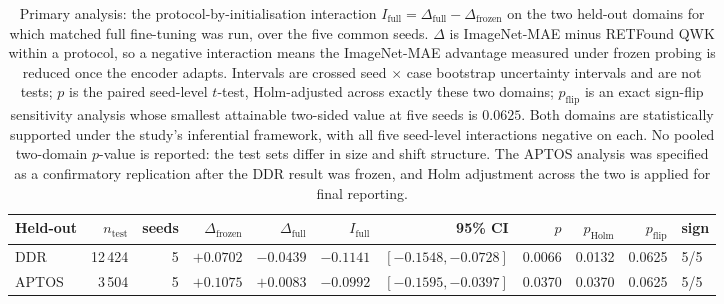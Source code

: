 \begin{table}[t]
\centering
\caption{Primary analysis: the protocol-by-initialisation interaction $I_{\text{full}} = \Delta_{\text{full}} - \Delta_{\text{frozen}}$ on the two held-out domains for which matched full fine-tuning was run, over the five common seeds. $\Delta$ is ImageNet-MAE minus RETFound QWK within a protocol, so a negative interaction means the ImageNet-MAE advantage measured under frozen probing is reduced once the encoder adapts. Intervals are crossed seed $\times$ case bootstrap uncertainty intervals and are not tests; $p$ is the paired seed-level $t$-test, Holm-adjusted across exactly these two domains; $p_{\text{flip}}$ is an exact sign-flip sensitivity analysis whose smallest attainable two-sided value at five seeds is $0.0625$. Both domains are statistically supported under the study's inferential framework, with all five seed-level interactions negative on each. No pooled two-domain $p$-value is reported: the test sets differ in size and shift structure. The APTOS analysis was specified as a confirmatory replication after the DDR result was frozen, and Holm adjustment across the two is applied for final reporting.}
\label{tab:jbhi-primary-interaction}
\begin{tabular}{lrrrrrrrrr}
\toprule
Held-out & $n_{\text{test}}$ & seeds & $\Delta_{\text{frozen}}$ & $\Delta_{\text{full}}$ & $I_{\text{full}}$ & 95\% CI & $p$ & $p_{\text{Holm}}$ & $p_{\text{flip}}$ & sign \\
\midrule
DDR & 12\,424 & 5 & $+0.0702$ & $-0.0439$ & $-0.1141$ & $[-0.1548, -0.0728]$ & 0.0066 & 0.0132 & 0.0625 & 5/5 \\
APTOS & 3\,504 & 5 & $+0.1075$ & $+0.0083$ & $-0.0992$ & $[-0.1595, -0.0397]$ & 0.0370 & 0.0370 & 0.0625 & 5/5 \\
\bottomrule
\end{tabular}
\end{table}
